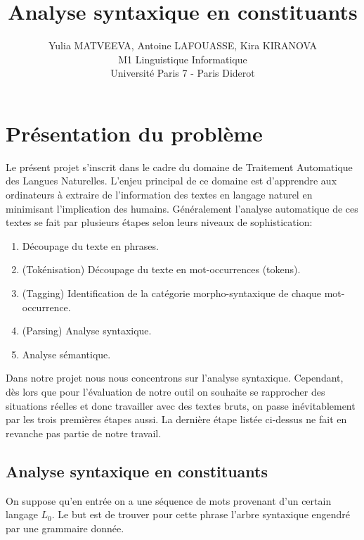 \documentclass[12pt]{article}
\begin{document}
\title{Analyse syntaxique en constituants}
\author{Yulia MATVEEVA, Antoine LAFOUASSE, Kira KIRANOVA\\
M1 Linguistique Informatique\\
Universit\'e Paris 7 - Paris Diderot}
\date{}
\maketitle

\section{Pr\'esentation du probl\`eme}

Le pr\'esent projet s'inscrit dans le cadre du domaine de Traitement Automatique
des Langues Naturelles. L'enjeu principal de ce domaine est d'apprendre aux ordinateurs  \`a extraire de l'information des textes en langage naturel en minimisant l'implication des humains. G\'en\'eralement l'analyse automatique de ces textes se fait par plusieurs \'etapes selon leurs niveaux de sophistication:

\begin{enumerate}
\item D\'ecoupage du texte en phrases.
\item (Tok\'enisation) D\'ecoupage du texte en mot-occurrences (tokens).
\item (Tagging) Identification de la cat\'egorie morpho-syntaxique de chaque
mot-occurrence.
\item (Parsing) Analyse syntaxique.
\item Analyse s\'emantique.
\end{enumerate}

Dans notre projet nous nous concentrons sur l'analyse syntaxique. Cependant, d\`es lors que pour l'\'evaluation de notre outil on souhaite se rapprocher des situations r\'eelles et donc travailler avec des textes bruts, on passe in\'evitablement par les trois premi\`eres \'etapes aussi. La derni\`ere \'etape list\'ee ci-dessus ne fait en revanche pas partie de notre travail.

\subsection{Analyse syntaxique en constituants}
 On suppose qu'en entr\'ee on a une s\'equence de mots provenant d'un certain
 langage $L_0$. Le but est de trouver pour cette phrase l'arbre syntaxique
 engendr\'e par une grammaire donn\'ee.
\end{document}
